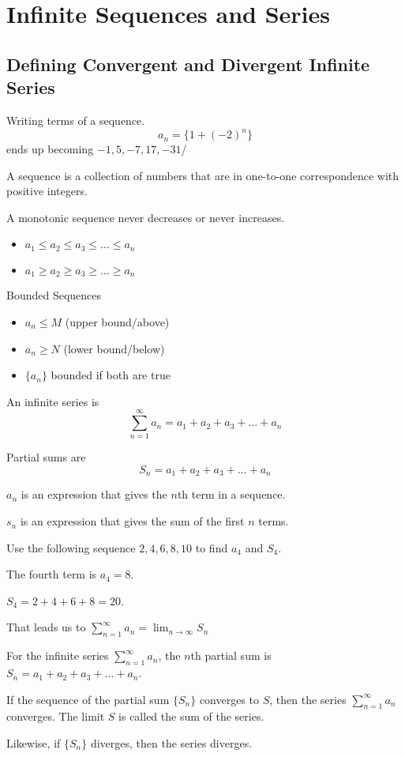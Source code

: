 \documentclass[../chem.tex]{subfiles}
\begin{document}
\chapter{Infinite Sequences and Series}
\section{Defining Convergent and Divergent Infinite Series}
Writing terms of a sequence.
\[ a_n = \{1+(-2)^n\} \]
ends up becoming $-1,5,-7,17,-31$/

A sequence is a collection of numbers that are in one-to-one correspondence with positive integers.

A monotonic sequence never decreases or never increases.
\begin{itemize}
    \item $a_1\leq a_2\leq a_3\leq \dots \leq a_n$
    \item $a_1\geq a_2 \geq a_3\geq \dots \geq a_n$
\end{itemize}

Bounded Sequences 
\begin{itemize}
    \item $a_n\leq M$ (upper bound/above)
    \item $a_n\geq N$ (lower bound/below)
    \item $\{a_n\}$ bounded if both are true 
\end{itemize}

An infinite series is 
\[ \sum_{n=1}^{\infty} a_n = a_1+a_2+a_3+\dots + a_n \]

Partial sums are 
\[ S_n=a_1+a_2+a_3+\dots + a_n \]

$a_n$ is an expression that gives the $n$th term in a sequence.

$s_n$ is an expression that gives the sum of the first $n$ terms.

\begin{example}
    Use the following sequence $2,4,6,8,10$ to find $a_4$ and $S_4$.

    The fourth term is $a_4=8$.

    $S_4=2+4+6+8=20$.
\end{example}

That leads us to $\sum_{n=1}^{\infty}a_n = \lim_{n\to \infty}S_n$ 

\begin{definition}
    For the infinite series $\sum_{n=1}^{\infty} a_n$, the $n$th partial sum is $S_n=a_1+a_2+a_3+\dots + a_n$.

    If the sequence of the partial sum $\{S_n\}$ converges to $S$, then the series $\sum_{n=1}^{\infty}a_n$ converges. The limit $S$ is called the sum of the series.

    Likewise, if $\{S_n\}$ diverges, then the series diverges.
\end{definition}
\end{document}
